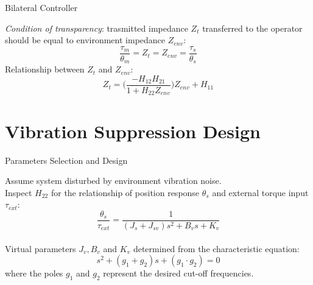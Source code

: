 \documentclass[10pt]{beamer}
\begin{document}
\begin{frame}{Bilateral Controller}

\textit{Condition of transparency}: trasmitted impedance $ Z_{t} $ transferred to the operator should be equal to environment impedance $ Z_{env} $:
\begin{equation*}
	\frac{\tau_m}{\theta_m} = Z_t = Z_{env} = \frac{\tau_s}{\theta_s}
\end{equation*}
Relationship between $ Z_{t} $ and $ Z_{env} $:
\begin{equation*}
	Z_t = \big(\dfrac{-H_{12} H_{21}}{1 + H_{22} Z_{env}}\big)Z_{env} + H_{11}
\end{equation*}


\end{frame}


\section{Vibration Suppression Design}

\begin{frame}{Parameters Selection and Design}

Assume system disturbed by environment vibration noise.\\
\bigskip
Inspect $ H_{22} $ for the relationship of position response $ \theta_s $ and external torque input $ \tau_{ext} $:
\begin{equation*}
	\dfrac{\theta_s}{\tau_{ext}} = \dfrac{1}{(J_s + J_{sv}) s^2 + B_v s + K_v}
	\label{H_22}
\end{equation*}\\
\bigskip
Virtual parameters $ J_{v}, B_{v} $ and $ K_{v} $ determined from the characteristic equation:
\begin{equation*}
	s^{2} + (g_{1} + g_{2})s + (g_{1} \cdot g_{2}) = 0
\end{equation*}
where the poles $ g_1 $ and $ g_2 $ represent the desired cut-off frequencies.

\end{frame}
\end{document}
